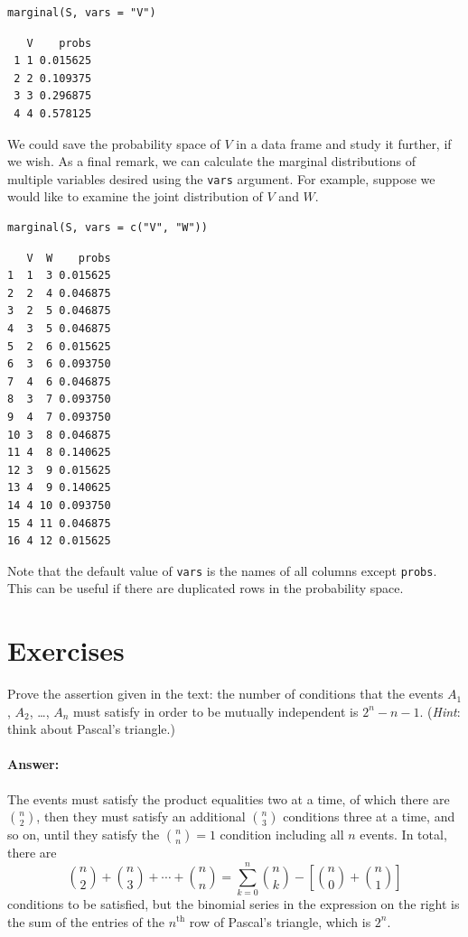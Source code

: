 \documentclass[captions=tableheading]{scrbook}
\begin{document}
\begin{verbatim}
marginal(S, vars = "V")
\end{verbatim}

\begin{verbatim}
   V    probs
 1 1 0.015625
 2 2 0.109375
 3 3 0.296875
 4 4 0.578125
\end{verbatim}

We could save the probability space of \(V\) in a data frame and study it further, if we wish. As a final remark, we can calculate the marginal distributions of multiple variables desired using the \texttt{vars} argument. For example, suppose we would like to examine the joint distribution of \(V\) and \(W\). 


\begin{verbatim}
marginal(S, vars = c("V", "W"))
\end{verbatim}


\begin{verbatim}
   V  W    probs
1  1  3 0.015625
2  2  4 0.046875
3  2  5 0.046875
4  3  5 0.046875
5  2  6 0.015625
6  3  6 0.093750
7  4  6 0.046875
8  3  7 0.093750
9  4  7 0.093750
10 3  8 0.046875
11 4  8 0.140625
12 3  9 0.015625
13 4  9 0.140625
14 4 10 0.093750
15 4 11 0.046875
16 4 12 0.015625
\end{verbatim}

Note that the default value of \texttt{vars} is the names of all columns except \texttt{probs}. This can be useful if there are duplicated rows in the probability space.

\newpage{}
\section{Exercises}
\label{sec-4-10}


\setcounter{thm}{0}

\begin{xca}
\label{xca:numb-cond-indep}
Prove the assertion given in the text: the number of conditions that the events \(A_{1}\), \(A_{2}\), \ldots{}, \(A_{n}\) must satisfy in order to be mutually independent is \(2^{n}-n-1\). (\emph{Hint}: think about Pascal's triangle.)
\end{xca}

\paragraph*{Answer:}

The events must satisfy the product equalities two at a time, of which there are \({n \choose 2}\), then they must satisfy an additional \({n \choose 3}\) conditions three at a time, and so on, until they satisfy the \({n \choose n}=1\) condition including all \(n\) events. In total, there are 
\[
{n \choose 2}+{n \choose 3}+\cdots+{n \choose n}=\sum_{k=0}^{n}{n \choose k}-\left[{n \choose 0}+{n \choose 1}\right]
\]
conditions to be satisfied, but the binomial series in the expression on the right is the sum of the entries of the \(n^{\mathrm{th}}\) row of Pascal's triangle, which is \(2^{n}\).
\end{document}
